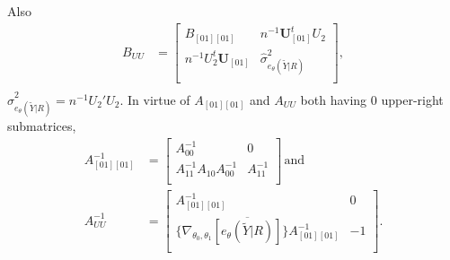 \documentclass[12pt]{article}
\begin{document}
Also
\begin{align*}
B_{UU} &=  \left[ \begin{array}{cc}
              B_{[01][01]}& n^{-1}\mathbf{U}_{[01]}^{t}  U_{2}\\ 
              n^{-1} U_{2}^{t}\mathbf{U}_{[01]} & \hat{\sigma}^{2}_{
                                                  e_{\theta}(\tilde{Y}|R)
                                                  } \\ 
      \end{array}
\right]  , \\  
\end{align*}
$\hat{\sigma}^{2}_{ e_{\theta}(\tilde{Y}|R) }  = n^{-1}U_{2}'U_{2}$.
In virtue of $A_{[01][01]}$ and $A_{UU}$ both having 0 upper-right
submatrices, 
\begin{align*}
A_{[01][01]}^{-1} &=\left[
               \begin{array}{cc}
                 A_{00}^{-1}& 0 \\
                  A_{11}^{-1} A_{10}A_{00}^{-1} & A_{11}^{-1} \\
               \end{array}
\right] \, \mathrm{and} \\
  A_{UU}^{-1} &= \left[
    \begin{array}{cc}
      A_{[01][01]}^{-1}& 0 \\[1ex] {}
       \{ \nabla_{\theta_{0}, \theta_{1}}
      \overline{[e_{\theta}(\tilde{Y} | R)]} \} A_{[01][01]}^{-1} & -1 \\
    \end{array}
\right]  
.
\end{align*}
\end{document}
